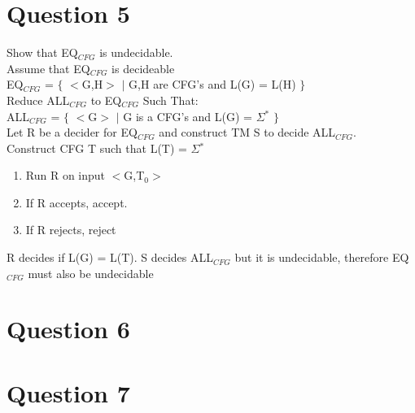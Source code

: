 \documentclass[10pt,a4paper]{article}
\begin{document}
\section*{Question 5}
Show that EQ$_{CFG}$ is undecidable.\\
Assume that EQ$_{CFG}$ is decideable\\
EQ$_{CFG}$ = $\lbrace$ $<$G,H$>$ $\mid$ G,H are CFG's and L(G) = L(H) $\rbrace$
\\
Reduce ALL$_{CFG}$ to EQ$_{CFG}$ Such That:
\\
ALL$_{CFG}$ = $\lbrace$ $<$G$>$ $\mid$ G is a CFG's and L(G) = $\Sigma$$^{\ast}$ $\rbrace$
\\
Let R be a decider for EQ$_{CFG}$ and construct TM S to decide ALL$_{CFG}$.
\\
Construct CFG T such that L(T) = $\Sigma$$^{\ast}$
\begin{enumerate}
  \item Run R on input $<$G,T$_{0}$$>$
  \item If R accepts, accept.
  \item If R rejects, reject 
\end{enumerate}
R decides if L(G) = L(T). S decides ALL$_{CFG}$ but it is undecidable, therefore EQ$_{CFG}$ must also be undecidable 

\section*{Question 6}


\section*{Question 7}
\end{document}

